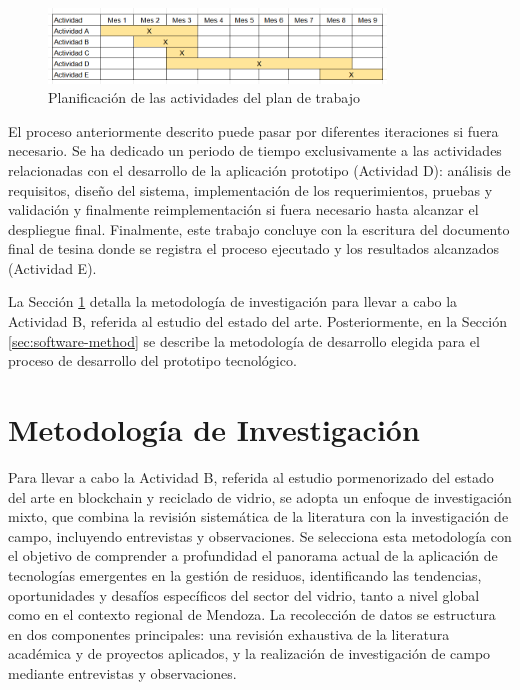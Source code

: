 \begin{figure}[!htpb]
    \centering
    \includegraphics[width=0.8\textwidth]{Figures/activities-plan.png}
    \caption{Planificación de las actividades del plan de trabajo}
    \label{fig:activities-plan}
\end{figure}

El proceso anteriormente descrito puede pasar por diferentes iteraciones si fuera necesario.
Se ha dedicado un periodo de tiempo exclusivamente a las actividades relacionadas con el desarrollo de la aplicación prototipo (Actividad D): análisis de requisitos, diseño del sistema, implementación de los requerimientos, pruebas y validación y finalmente reimplementación si fuera necesario hasta alcanzar el despliegue final. Finalmente, este trabajo concluye con la escritura del documento final de tesina donde se registra el proceso ejecutado y los resultados alcanzados (Actividad E).

La Sección \ref{sec:research-method} detalla la metodología de investigación para llevar a cabo la Actividad B, referida al estudio del estado del arte. Posteriormente, en la Sección \ref{sec:software-method} se describe la metodología de desarrollo elegida para el proceso de desarrollo del prototipo tecnológico.

\section{Metodología de Investigación}
\label{sec:research-method}

Para llevar a cabo la Actividad B, referida al estudio pormenorizado del estado del arte en blockchain y reciclado de vidrio, se adopta un enfoque de investigación mixto, que combina la revisión sistemática de la literatura con la investigación de campo, incluyendo entrevistas y observaciones.
Se selecciona esta metodología con el objetivo de comprender a profundidad el panorama actual de la aplicación de tecnologías emergentes en la gestión de residuos, identificando las tendencias, oportunidades y desafíos específicos del sector del vidrio, tanto a nivel global como en el contexto regional de Mendoza.
La recolección de datos se estructura en dos componentes principales: una revisión exhaustiva de la literatura académica y de proyectos aplicados, y la realización de investigación de campo mediante entrevistas y observaciones.

